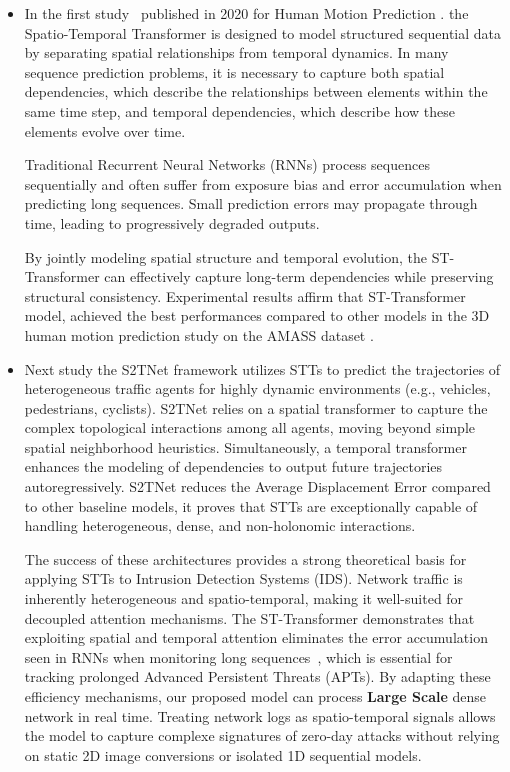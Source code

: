 \documentclass[12pt, a4paper]{report}
\begin{document}
\begin{itemize}
    \item 
In the first study~\cite{aksan2020spatio} published in 2020 for Human Motion Prediction . the Spatio-Temporal Transformer is designed to model structured sequential data by separating spatial relationships from temporal dynamics. In many sequence prediction problems, it is necessary to capture both spatial dependencies, which describe the relationships between elements within the same time step, and temporal dependencies, which describe how these elements evolve over time.

Traditional Recurrent Neural Networks (RNNs) process sequences sequentially and often suffer from exposure bias and error accumulation when predicting long sequences. Small prediction errors may propagate through time, leading to progressively degraded outputs.

By jointly modeling spatial structure and temporal evolution, the ST-Transformer can effectively capture long-term dependencies while preserving structural consistency. Experimental results affirm that  ST-Transformer model, achieved the best performances compared to other models in the 3D human motion prediction study on the AMASS dataset \cite{AMASS:2019}.




\item Next study \cite{s2tnet2021} the S2TNet framework utilizes STTs to predict the trajectories of heterogeneous traffic agents for highly dynamic environments (e.g., vehicles, pedestrians, cyclists). S2TNet relies on a spatial transformer to capture the complex topological interactions among all agents, moving beyond simple spatial neighborhood heuristics. Simultaneously, a temporal transformer enhances the modeling of dependencies to output future trajectories autoregressively. S2TNet reduces the Average Displacement Error compared to other baseline models, it proves that STTs are exceptionally capable of handling heterogeneous, dense, and non-holonomic interactions.





The success of these architectures provides a strong theoretical basis for applying STTs to Intrusion Detection Systems (IDS). Network traffic is inherently heterogeneous and spatio-temporal, making it well-suited for decoupled attention mechanisms. The ST-Transformer demonstrates that exploiting spatial and temporal attention eliminates the error accumulation seen in RNNs when monitoring long sequences~\cite{aksan2020spatio}, which is essential for tracking prolonged Advanced Persistent Threats (APTs). By adapting these efficiency mechanisms, our proposed model can process \textbf{Large Scale}  dense network  in real time. Treating network logs as spatio-temporal signals allows the model to capture complexe signatures of zero-day attacks without relying on static 2D image conversions or isolated 1D sequential models.
\end{itemize} 
\end{document}
